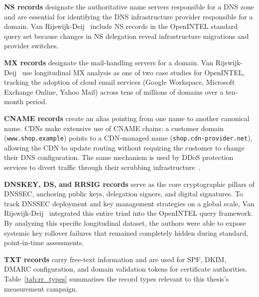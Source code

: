 \textbf{\ac{NS} records} designate the authoritative name servers responsible for a \ac{DNS} zone and are essential for identifying the \ac{DNS} infrastructure provider responsible for a domain. Van Rijswijk-Deij~\cite{vanRijswijk2016} include \ac{NS} records in the OpenINTEL standard query set because changes in \ac{NS} delegation reveal infrastructure migrations and provider switches.

\textbf{\ac{MX} records} designate the mail-handling servers for a domain. Van Rijswijk-Deij~\cite{vanRijswijk2016} use longitudinal \ac{MX} analysis as one of two case studies for OpenINTEL, tracking the adoption of cloud email services (Google Workspace, Microsoft Exchange Online, Yahoo Mail) across tens of millions of domains over a ten-month period.

\textbf{\ac{CNAME} records} create an alias pointing from one name to another canonical name. \ac{CDN}s make extensive use of \ac{CNAME} chains: a customer domain (\texttt{www.shop.example}) points to a \ac{CDN}-managed name (\texttt{shop.cdn-provider.net}), allowing the \ac{CDN} to update routing without requiring the customer to change their \ac{DNS} configuration. The same mechanism is used by \ac{DDoS} protection services to divert traffic through their scrubbing infrastructure~\cite{Jonker2016}.

\textbf{DNSKEY, DS, and RRSIG records} serve as the core cryptographic pillars of \ac{DNSSEC}, anchoring public keys, delegation signers, and digital signatures. To track \ac{DNSSEC} deployment and key management strategies on a global scale, Van Rijswijk-Deij~\cite{vanRijswijk2016} integrated this entire triad into the OpenINTEL query framework. By analyzing this specific longitudinal dataset, the authors were able to expose systemic key rollover failures that remained completely hidden during standard, point-in-time assessments.

\textbf{\ac{TXT} records} carry free-text information and are used for \ac{SPF}, \ac{DKIM}, \ac{DMARC} configuration, and domain validation tokens for certificate authorities. Table~\ref{tab:rr_types} summarises the record types relevant to this thesis's measurement campaign.

